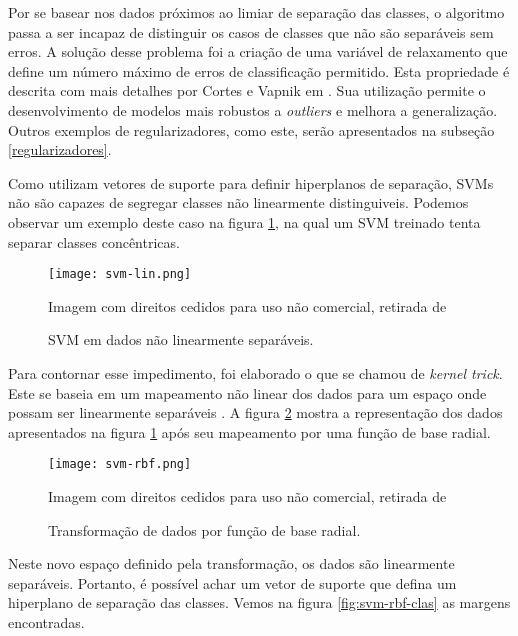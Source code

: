 Por se basear nos dados próximos ao limiar de separação das classes, o algoritmo passa a ser incapaz de distinguir os casos de classes que não são separáveis sem erros. A solução desse problema foi a criação de uma variável de relaxamento que define um número máximo de erros de classificação permitido. Esta propriedade é descrita com mais detalhes por Cortes e Vapnik em \cite{cortes95}. Sua utilização permite o desenvolvimento de modelos mais robustos a \textit{outliers} e melhora a generalização. Outros exemplos de regularizadores, como este, serão apresentados na subseção \ref{regularizadores}.

Como utilizam vetores de suporte para definir hiperplanos de separação, SVMs não são capazes de segregar classes não linearmente distinguiveis. Podemos observar um exemplo deste caso na figura \ref{fig:svm-lin}, na qual um SVM treinado tenta separar classes concêntricas.

\begin{figure}
\begin{center} {
    \begin{center}
    \texttt{[image: svm-lin.png]}
    \caption{SVM em dados não linearmente separáveis.}
    \small Imagem com direitos cedidos para uso não comercial, retirada de \cite{vanderplas15}
    \label{fig:svm-lin}
    \end{center}
}
\end{center}
\end{figure}

Para contornar esse impedimento, foi elaborado o que se chamou de \textit{kernel trick}. Este se baseia em um mapeamento não linear dos dados para um espaço onde possam ser linearmente separáveis \cite{scholkopf02}. A figura \ref{fig:svm-rbf} mostra a representação dos dados apresentados na figura \ref{fig:svm-lin} após seu mapeamento por uma função de base radial.

\begin{figure}
\begin{center} {
    \begin{center}
    \texttt{[image: svm-rbf.png]}
    \caption{Transformação de dados por função de base radial.}
    \small Imagem com direitos cedidos para uso não comercial, retirada de \cite{vanderplas15}
    \label{fig:svm-rbf}
    \end{center}
}
\end{center}
\end{figure}

Neste novo espaço definido pela transformação, os dados são linearmente separáveis. Portanto, é possível achar um vetor de suporte que defina um hiperplano de separação das classes. Vemos na figura \ref{fig:svm-rbf-clas} as margens encontradas.

